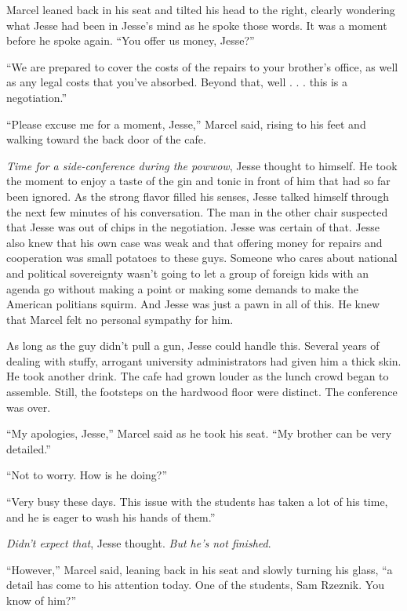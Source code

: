 \documentclass[12pt]{book}
\begin{document}
Marcel leaned back in his seat and tilted his head to the right, clearly wondering what Jesse had been in Jesse's mind as he spoke those words.  It was a moment before he spoke again.  ``You offer us money, Jesse?''

``We are prepared to cover the costs of the repairs to your brother's office, as well as any legal costs that you've absorbed.  Beyond that, well . . . this is a negotiation.''

``Please excuse me for a moment, Jesse,'' Marcel said, rising to his feet and walking toward the back door of the cafe.

\emph{Time for a side-conference during the powwow}, Jesse thought to himself.  He took the moment to enjoy a taste of the gin and tonic in front of him that had so far been ignored.  As the strong flavor filled his senses, Jesse talked himself through the next few minutes of his conversation.  The man in the other chair suspected that Jesse was out of chips in the negotiation.  Jesse was certain of that.  Jesse also knew that his own case was weak and that offering money for repairs and cooperation was small potatoes to these guys.  Someone who cares about national and political sovereignty wasn't going to let a group of foreign kids with an agenda go without making a point or making some demands to make the American politians squirm.  And Jesse was just a pawn in all of this.  He knew that Marcel felt no personal sympathy for him.

As long as the guy didn't pull a gun, Jesse could handle this.  Several years of dealing with stuffy, arrogant university administrators had given him a thick skin.  He took another drink.  The cafe had grown louder as the lunch crowd began to assemble.  Still, the footsteps on the hardwood floor were distinct.  The conference was over.

``My apologies, Jesse,'' Marcel said as he took his seat.  ``My brother can be very detailed.''

``Not to worry.  How is he doing?''

``Very busy these days.  This issue with the students has taken a lot of his time, and he is eager to wash his hands of them.''

\emph{Didn't expect that}, Jesse thought.  \emph{But he's not finished}.

``However,'' Marcel said, leaning back in his seat and slowly turning his glass, ``a detail has come to his attention today.  One of the students, Sam Rzeznik.  You know of him?''
\end{document}
